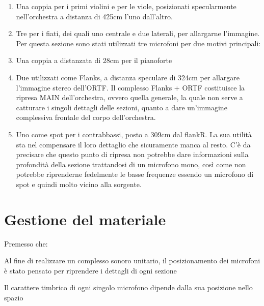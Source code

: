 \begin{enumerate}
\item Una coppia per i primi violini e per le viole, posizionati specularmente nell'orchestra a distanza di 425cm l'uno dall'altro.

\item Tre per i fiati, dei quali uno centrale e due laterali, per allargarne l'immagine. Per questa sezione sono stati utilizzati tre microfoni per due motivi principali:

\item Una coppia a distanzata di 28cm per il pianoforte

\item Due utilizzati come Flanks, a distanza speculare di 324cm per allargare l'immagine stereo dell'ORTF. Il complesso Flanks + ORTF costituisce la ripresa MAIN dell'orchestra, ovvero quella generale, la quale non serve a catturare i singoli dettagli delle sezioni, quanto a dare un'immagine complessiva frontale del corpo dell'orchestra.

\item Uno come spot per i contrabbassi, posto a 309cm dal flankR. La sua utilità sta nel compensare il loro dettaglio che sicuramente manca al resto. C'è da precisare che questo punto di ripresa non potrebbe dare informazioni sulla profondità della sezione trattandosi di un microfono mono, così come non potrebbe riprenderne fedelmente le basse frequenze essendo un microfono di spot e quindi molto vicino alla sorgente.
\end{enumerate}

\section*{Gestione del materiale}
Premesso che:
\begin{compactitem}
\item Al fine di realizzare un complesso sonoro unitario, il posizionamento dei microfoni è stato pensato per riprendere i dettagli di ogni sezione
\item Il carattere timbrico di ogni singolo microfono dipende dalla sua posizione nello spazio
\end{compactitem}

